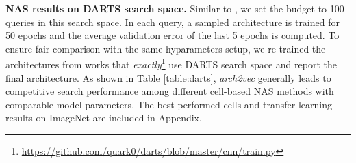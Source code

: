 \vspace{1mm}
\textbf{NAS results on DARTS search space.}
Similar to \cite{white2019bananas}, we set the budget to 100 queries in this search space. In each query, a sampled architecture is trained for 50 epochs and the average validation error of the last 5 epochs is computed. To ensure fair comparison with the same hyparameters setup, we re-trained the architectures from works that \emph{exactly}\footnote{\url{https://github.com/quark0/darts/blob/master/cnn/train.py}} use DARTS search space and report the final architecture. 
As shown in Table \ref{table:darts}, \textit{arch2vec} generally leads to competitive search performance among different cell-based NAS methods with comparable model parameters. The best performed cells and transfer learning results on ImageNet \cite{imagenet_cvpr09} are included in Appendix. 


